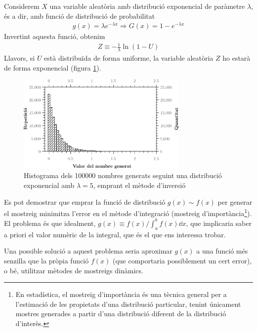 \begin{example}
	Considerem $X$ una variable aleatòria amb distribució exponencial de paràmetre $\lambda$, és a dir, amb funció de distribució de probabilitat
	\begin{align*}
		g(x) = \lambda e^{-\lambda x} \Rightarrow G(x) = 1 - e^{-\lambda x}
	\end{align*}
	Invertint aquesta funció, obtenim
	\begin{align*}
		Z \equiv - \frac{1}{\lambda} \ln(1 - U)
	\end{align*}
	Llavors, si $U$ està distribuïda de forma uniforme, la variable aleatòria $Z$ ho estarà de forma exponencial (figura \ref{fig:inversio-exp}).
	\begin{figure}[H]
		\centering
		\includegraphics[width=0.74\textwidth]{./images/inversio-exp}
		\caption{Histograma dels \num{100000} nombres generats seguint una distribució exponencial amb $\lambda = 5$, emprant el mètode d'inversió}
		\label{fig:inversio-exp}
	\end{figure}
\end{example}

Es pot demostrar que emprar la funció de distribució $g(x) \sim f(x)$ per generar el mostreig minimitza l'error en el mètode d'integració (mostreig d'importància\footnote{En estadística, el mostreig d'importància és una tècnica general per a l'estimació de les propietats d'una distribució particular, tenint únicament mostres generades a partir d'una distribució diferent de la distribució d'interès.}). El problema és que idealment, $g(x) \equiv f(x) / \int_{a}^{b} f(x) \dd{x}$, que implicaria saber a priori el valor numèric de la integral, que és el que ens interessa trobar.

Una possible solució a aquest problema seria aproximar $g(x)$ a una funció més senzilla que la pròpia funció $f(x)$ (que comportaria possiblement un cert error), o bé, utilitzar mètodes de mostreigs dinàmics.

